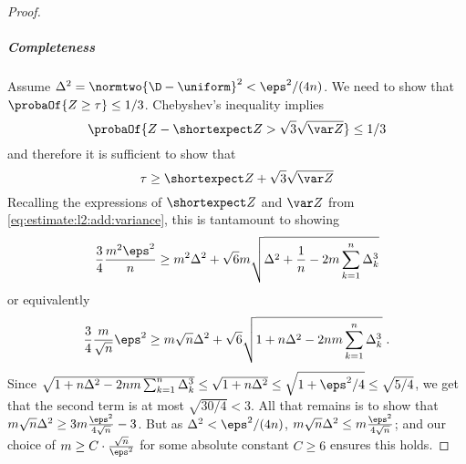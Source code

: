 \begin{proof}
\subparagraph{Completeness} Assume $\Delta^2=\normtwo{\D-\uniform}^2 < \eps^2/(4n)$. We need to show that $\probaOf{ Z \geq \tau } \leq 1/3$. Chebyshev's inequality implies
\[
    \probaOf{ Z - \shortexpect Z > \sqrt{3}\sqrt{\var Z} } \leq 1/3
\]
and therefore it is sufficient to show that 
\[
    \tau \geq \shortexpect Z + \sqrt{3}\sqrt{\var Z}
\]
Recalling the expressions of $\shortexpect Z$ and $\var Z$ from \eqref{eq:estimate:l2:add:variance}, this is tantamount to showing
\[
    \frac{3}{4}\frac{m^2\eps^2}{n} \geq m^2\Delta^2 + \sqrt{6}m\sqrt{\Delta^2 + \frac{1}{n} -2m \sum_{k=1}^n \Delta_k^3}
\]
or equivalently
\[
    \frac{3}{4} \frac{m}{\sqrt{n}}\eps^2 \geq m \sqrt{n} \Delta^2 + \sqrt{6} \sqrt{1 + n\Delta^2 -2nm \sum_{k=1}^n \Delta_k^3}\;.
\]
Since $\sqrt{1 + n\Delta^2 -2 n m  \sum_{k=1}^n \Delta_k^3} \leq \sqrt{1 + n\Delta^2} \leq \sqrt{1 + \eps^2/4} \leq \sqrt{5/4}$, we get that the second term is at most $\sqrt{30/4} < 3$. All that remains is to show that $m\sqrt{n}\Delta^2 \geq 3m\frac{\eps^2}{4\sqrt{n}}-3$. But as $\Delta^2 < \eps^2/(4n)$, $m\sqrt{n}\Delta^2 \leq m\frac{\eps^2}{4\sqrt{n}}$; and our choice of $m \geq C\cdot\frac{\sqrt{n}}{\eps^2}$ for some absolute constant $C \geq 6$  ensures this holds.
\end{proof}
